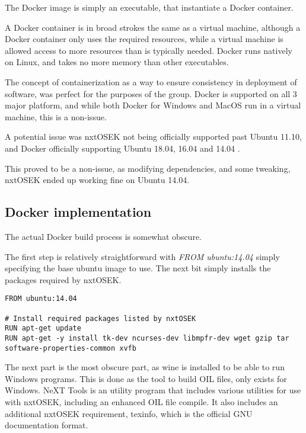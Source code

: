 The Docker image is simply an executable, that instantiate a Docker container.

A Docker container is in broad strokes the same as a virtual machine, although a Docker container only uses the required resources, while a virtual machine is allowed access to more resources than is typically needed.
Docker runs natively on Linux, and takes no more memory than other executables.

The concept of containerization as a way to ensure consistency in deployment of software, was perfect for the purposes of the group.
Docker is supported on all 3 major platform, and while both Docker for Windows and MacOS run in a virtual machine, this is a non-issue.

A potential issue was nxtOSEK not being officially supported past Ubuntu 11.10, and Docker officially supporting Ubuntu 18.04, 16.04 and 14.04 \cite{dockerubuntu}.

This proved to be a non-issue, as modifying dependencies, and some tweaking, nxtOSEK ended up working fine on Ubuntu 14.04.

\subsection{Docker implementation}\label{subsec:dockerimplementation}
The actual Docker build process is somewhat obscure.

The first step is relatively straightforward with \textit{FROM ubuntu:14.04} simply specifying the base ubuntu image to use.
The next bit simply installs the packages required by nxtOSEK.
\begin{lstlisting}[language=docker,label={lst:dockerimplementation1},caption={Version definition and installation of packages required by nxtOSEK}]
FROM ubuntu:14.04

# Install required packages listed by nxtOSEK
RUN apt-get update
RUN apt-get -y install tk-dev ncurses-dev libmpfr-dev wget gzip tar software-properties-common xvfb
\end{lstlisting}

The next part is the most obscure part, as wine is installed to be able to run Windows programs.
This is done as the tool to build OIL files, only exists for Windows.
NeXT Tools is an utility program that includes various utilities for use with nxtOSEK, including an enhanced OIL file compile\cite{nxttool}.
It also includes an additional nxtOSEK requirement, texinfo, which is the official GNU documentation format\cite{texinfo}.

